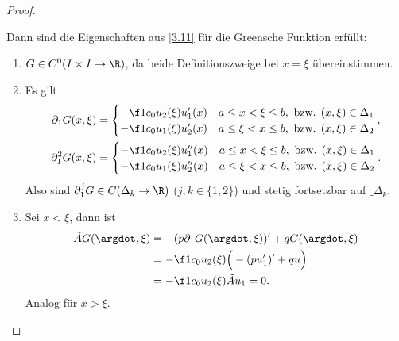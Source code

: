\begin{st}
\begin{proof}
\begin{seg}[(ii)$\implies$(i)]
\begin{itemize}
					Dann sind die Eigenschaften aus \ref{3.11} für die Greensche Funktion erfüllt:
					\begin{enumerate}[1)]
						\item
							$G \in C^0(I \times I \to \R)$, da beide Definitionszweige bei $x = \xi$ übereinstimmen.
						\item
							Es gilt
							\begin{align*}
								\partial_1 G(x,\xi) &= \begin{cases}
									-\f 1{c_0} u_2(\xi) u_1'(x) & a \le x < \xi \le b, \text{ bzw. $(x,\xi) \in \Delta_1$} \\
									-\f 1{c_0} u_1(\xi) u_2'(x) & a \le \xi < x \le b, \text{ bzw. $(x,\xi) \in \Delta_2$}
								\end{cases}, \\
								\partial_1^2 G(x,\xi) &= \begin{cases}
									-\f 1{c_0} u_2(\xi) u_1''(x) & a \le x < \xi \le b, \text{ bzw. $(x,\xi) \in \Delta_1$} \\
									-\f 1{c_0} u_1(\xi) u_2''(x) & a \le \xi < x \le b, \text{ bzw. $(x,\xi) \in \Delta_2$}
								\end{cases}.
							\end{align*}
							Also sind $\partial_1^j G \in C(\Delta_k \to \R)$ ($j,k\in \{1,2\}$) und stetig fortsetzbar auf $\_{\Delta_k}$.
						\item
							Sei $x < \xi$, dann ist
							\begin{align*}
								\tilde A G(\argdot, \xi)
								&= -(p\partial_1 G(\argdot, \xi))' + qG(\argdot, \xi)  \\
								&= - \f 1{c_0} u_2(\xi) \Big( - (pu_1')' + qu \Big) \\
								&= - \f 1{c_0} u_2(\xi) \tilde A u_1
								= 0.
							\end{align*}
							Analog für $x > \xi$.


\end{enumerate}
\end{itemize}
\end{seg}
\end{proof}
\end{st}
